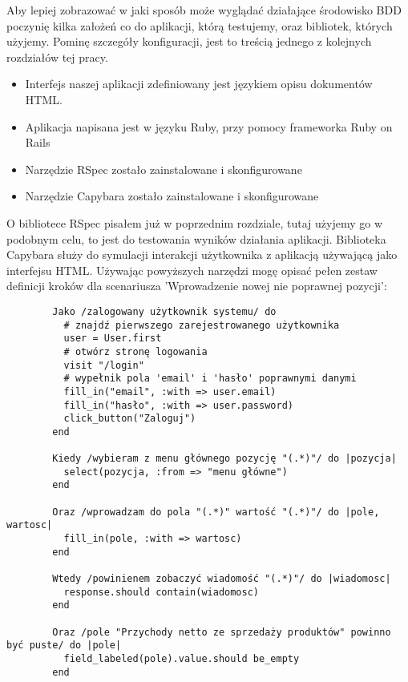       Aby lepiej zobrazować w jaki sposób może wyglądać działające środowisko BDD poczynię kilka założeń co do aplikacji, którą testujemy, oraz bibliotek, których użyjemy. Pominę szczegóły konfiguracji, jest to treścią jednego z kolejnych rozdziałów tej pracy.
      
      \begin{itemize}
        \item Interfejs naszej aplikacji zdefiniowany jest językiem opisu dokumentów HTML.
        \item Aplikacja napisana jest w języku Ruby, przy pomocy frameworka Ruby on Rails
        \item Narzędzie RSpec zostało zainstalowane i skonfigurowane
        \item Narzędzie Capybara zostało zainstalowane i skonfigurowane
      \end{itemize}
      
      O bibliotece RSpec pisałem już w poprzednim rozdziale, tutaj użyjemy go w podobnym celu, to jest do testowania wyników działania aplikacji. Biblioteka Capybara służy do symulacji interakcji użytkownika z aplikacją używającą jako interfejsu HTML. Używając powyższych narzędzi mogę opisać pełen zestaw definicji kroków dla scenariusza 'Wprowadzenie nowej nie poprawnej pozycji':
      
      \begin{verbatim}        
        Jako /zalogowany użytkownik systemu/ do
          # znajdź pierwszego zarejestrowanego użytkownika
          user = User.first
          # otwórz stronę logowania
          visit "/login"
          # wypełnik pola 'email' i 'hasło' poprawnymi danymi
          fill_in("email", :with => user.email)
          fill_in("hasło", :with => user.password)
          click_button("Zaloguj")
        end
        
        Kiedy /wybieram z menu głównego pozycję "(.*)"/ do |pozycja|
          select(pozycja, :from => "menu główne")
        end
        
        Oraz /wprowadzam do pola "(.*)" wartość "(.*)"/ do |pole, wartosc|
          fill_in(pole, :with => wartosc)
        end
        
        Wtedy /powinienem zobaczyć wiadomość "(.*)"/ do |wiadomosc|
          response.should contain(wiadomosc)
        end
        
        Oraz /pole "Przychody netto ze sprzedaży produktów" powinno być puste/ do |pole|
          field_labeled(pole).value.should be_empty
        end
      \end{verbatim}
      
